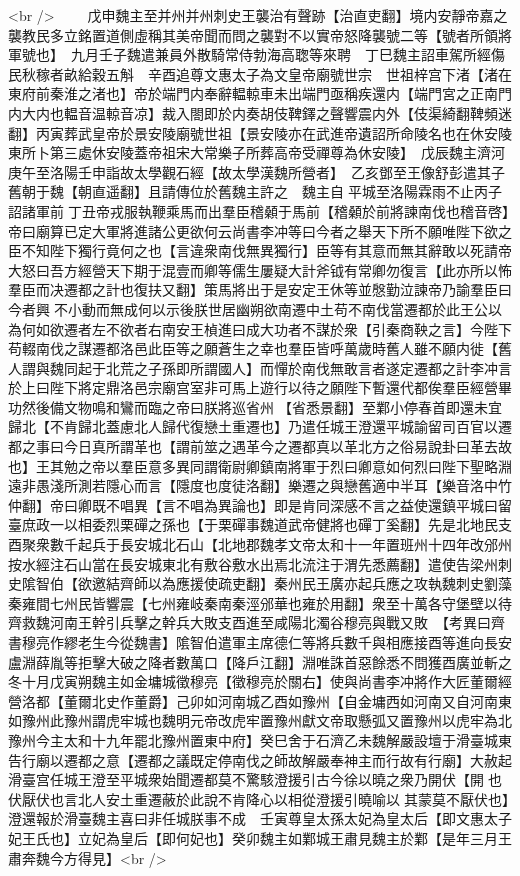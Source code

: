 <br />
　　戊申魏主至并州并州刺史王襲治有聲跡【治直吏翻】境内安靜帝嘉之襲教民多立銘置道側虛稱其美帝聞而問之襲對不以實帝怒降襲號二等【號者所領將軍號也】　九月壬子魏遣兼員外散騎常侍勃海高聦等來聘　丁巳魏主詔車駕所經傷民秋稼者畝給穀五斛　辛酉追尊文惠太子為文皇帝廟號世宗　世祖梓宫下渚【渚在東府前秦淮之渚也】帝於端門内奉辭輼輬車未出端門亟稱疾還内【端門宮之正南門内大内也輼音温輬音凉】裁入閤即於内奏胡伎鞞鐸之聲響震内外【伎渠綺翻鞞頻迷翻】丙寅葬武皇帝於景安陵廟號世祖【景安陵亦在武進帝遺詔所命陵名也在休安陵東所卜第三處休安陵蓋帝祖宋大常樂子所葬高帝受禪尊為休安陵】　戊辰魏主濟河庚午至洛陽壬申詣故太學觀石經【故太學漢魏所營者】　乙亥鄧至王像舒彭遣其子舊朝于魏【朝直遥翻】且請傳位於舊魏主許之　魏主自平城至洛陽霖雨不止丙子詔諸軍前丁丑帝戎服執鞭乘馬而出羣臣稽顙于馬前【稽顙於前將諫南伐也稽音啓】帝曰廟算已定大軍將進諸公更欲何云尚書李冲等曰今者之舉天下所不願唯陛下欲之臣不知陛下獨行竟何之也【言違衆南伐無異獨行】臣等有其意而無其辭敢以死請帝大怒曰吾方經營天下期于混壹而卿等儒生屢疑大計斧钺有常卿勿復言【此亦所以怖羣臣而决遷都之計也復扶又翻】策馬將出于是安定王休等並慇勤泣諫帝乃諭羣臣曰今者興不小動而無成何以示後朕世居幽朔欲南遷中土苟不南伐當遷都於此王公以為何如欲遷者左不欲者右南安王楨進曰成大功者不謀於衆【引秦商鞅之言】今陛下苟輟南伐之謀遷都洛邑此臣等之願蒼生之幸也羣臣皆呼萬歲時舊人雖不願内徙【舊人謂與魏同起于北荒之子孫即所謂國人】而憚於南伐無敢言者遂定遷都之計李冲言於上曰陛下將定鼎洛邑宗廟宫室非可馬上遊行以待之願陛下暫還代都俟羣臣經營畢功然後備文物鳴和鸞而臨之帝曰朕將巡省州【省悉景翻】至鄴小停春首即還未宜歸北【不肯歸北蓋慮北人歸代復戀土重遷也】乃遣任城王澄還平城諭留司百官以遷都之事曰今日真所謂革也【謂前筮之遇革今之遷都真以革北方之俗易說卦曰革去故也】王其勉之帝以羣臣意多異同謂衛尉卿鎮南將軍于烈曰卿意如何烈曰陛下聖略淵遠非愚淺所測若隱心而言【隱度也度徒洛翻】樂遷之與戀舊適中半耳【樂音洛中竹仲翻】帝曰卿既不唱異【言不唱為異論也】即是肯同深感不言之益使還鎮平城曰留臺庶政一以相委烈栗磾之孫也【于栗磾事魏道武帝健將也磾丁奚翻】先是北地民支酉聚衆數千起兵于長安城北石山【北地郡魏孝文帝太和十一年置班州十四年改邠州按水經注石山當在長安城東北有敷谷敷水出焉北流注于渭先悉薦翻】遣使告梁州刺史隂智伯【欲邀結齊師以為應援使疏吏翻】秦州民王廣亦起兵應之攻執魏刺史劉藻秦雍間七州民皆響震【七州雍岐秦南秦涇邠華也雍於用翻】衆至十萬各守堡壁以待齊救魏河南王幹引兵擊之幹兵大敗支酉進至咸陽北濁谷穆亮與戰又敗　【考異曰齊書穆亮作繆老生今從魏書】隂智伯遣軍主席德仁等將兵數千與相應接酉等進向長安盧淵薛胤等拒擊大破之降者數萬口【降戶江翻】淵唯誅首惡餘悉不問獲酉廣並斬之　冬十月戊寅朔魏主如金墉城徵穆亮【徵穆亮於關右】使與尚書李冲將作大匠董爾經營洛都【董爾北史作董爵】己卯如河南城乙酉如豫州【自金墉西如河南又自河南東如豫州此豫州謂虎牢城也魏明元帝改虎牢置豫州獻文帝取懸弧又置豫州以虎牢為北豫州今主太和十九年罷北豫州置東中府】癸巳舍于石濟乙未魏解嚴設壇于滑臺城東告行廟以遷都之意【遷都之議既定停南伐之師故解嚴奉神主而行故有行廟】大赦起滑臺宫任城王澄至平城衆始聞遷都莫不驚駭澄援引古今徐以曉之衆乃開伏【開也伏厭伏也言北人安土重遷蔽於此說不肯降心以相從澄援引曉喻以其蒙莫不厭伏也】澄還報於滑臺魏主喜曰非任城朕事不成　壬寅尊皇太孫太妃為皇太后【即文惠太子妃王氏也】立妃為皇后【即何妃也】癸卯魏主如鄴城王肅見魏主於鄴【是年三月王肅奔魏今方得見】<br />
